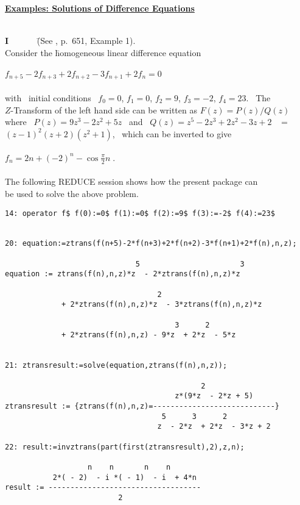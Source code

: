 \underline {{\bf Examples: Solutions of Difference Equations}}\\ \\
\begin{tabbing}
{\bf I} \ \ \ \ \ \ \= 

  (See \cite{BS}, p.\ 651, Example 1).\\
  \> Consider the \= homogeneous linear difference equation\\ \\
  \>\>  $f_{n+5} - 2 f_{n+3} + 2 f_{n+2} - 3 f_{n+1} + 2 f_{n}=0$\\ \\

  \> with \ initial conditions \ $f_0=0$, $f_1=0$, $f_2=9$, $f_3=-2$,
     $f_4=23$. \  The\\
  \> $Z$-Transform of the left hand side can be written as
     $F(z)=P(z)/Q(z)$ \\
  \> where \ $P(z)=9z^3-2z^2+5z$ \ 
     and \ $Q(z)=z^5-2z^3+2z^2-3z+2$ \ $=$\\ 
  \> $(z-1)^2(z+2)(z^2+1)$, \ which can be inverted to give\\ \\

 \>\>  $f_n = 2n + (-2)^n - \cos \frac{\pi}{2}n\;.$ \\ \\

  \> The following REDUCE session shows how the present package can
\\ \> be used to solve the above problem.

\end{tabbing}
\begin{verbatim}
14: operator f$ f(0):=0$ f(1):=0$ f(2):=9$ f(3):=-2$ f(4):=23$


20: equation:=ztrans(f(n+5)-2*f(n+3)+2*f(n+2)-3*f(n+1)+2*f(n),n,z);

                              5                       3
equation := ztrans(f(n),n,z)*z  - 2*ztrans(f(n),n,z)*z

                                   2
             + 2*ztrans(f(n),n,z)*z  - 3*ztrans(f(n),n,z)*z

                                       3      2
             + 2*ztrans(f(n),n,z) - 9*z  + 2*z  - 5*z


21: ztransresult:=solve(equation,ztrans(f(n),n,z));

                                             2
                                       z*(9*z  - 2*z + 5)
ztransresult := {ztrans(f(n),n,z)=----------------------------}
                                    5      3      2
                                   z  - 2*z  + 2*z  - 3*z + 2

22: result:=invztrans(part(first(ztransresult),2),z,n);

                   n    n       n    n
           2*( - 2)  - i *( - 1)  - i  + 4*n
result := -----------------------------------
                          2

\end{verbatim}

